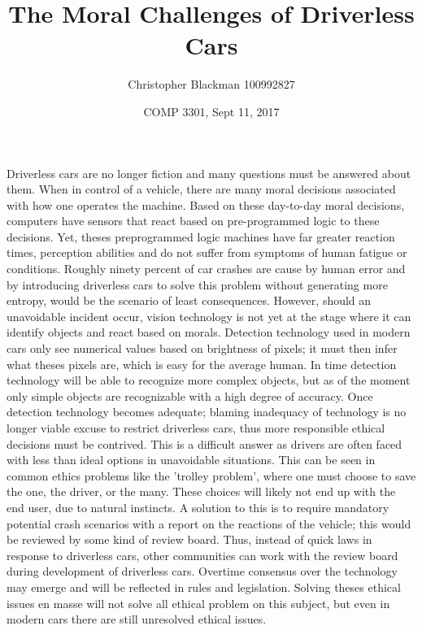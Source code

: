 \documentclass{article}[12pt]
\begin{document}
\title{\vspace{-4cm}
The Moral Challenges of Driverless Cars}
\author{Christopher Blackman 100992827}
\date{COMP 3301, Sept 11, 2017}

\maketitle



Driverless cars are no longer fiction and many questions must be answered about them.
When in control of a vehicle, there are many moral decisions associated with how one operates the machine.
Based on these day-to-day moral decisions, computers have sensors that react based on pre-programmed logic to these decisions.
Yet, theses preprogrammed logic machines have far greater reaction times, perception abilities and do not suffer from symptoms of human fatigue or conditions.
Roughly ninety percent of car crashes are cause by human error and by introducing driverless cars to solve this problem without generating more entropy, would be the scenario of least consequences.
However, should an unavoidable incident occur, vision technology is not yet at the stage where it can identify objects and react based on morals.
Detection technology used in modern cars only see numerical values based on brightness of pixels; it must then infer what theses pixels are, which is easy for the average human.
In time detection technology will be able to recognize more complex objects, but as of the moment only simple objects are recognizable with a high degree of accuracy.
Once detection technology becomes adequate; blaming inadequacy of technology is no longer viable excuse to restrict driverless cars, thus more responsible ethical decisions must be contrived.
This is a difficult answer as drivers are often faced with less than ideal options in unavoidable situations.
This can be seen in common ethics problems like the 'trolley problem', where one must choose to save the one, the driver, or the many.
These choices will likely not end up with the end user, due to natural instincts. 
A solution to this is to require mandatory potential crash scenarios with a report on the reactions of the vehicle; this would be reviewed by some kind of review board.
Thus, instead of quick laws in response to driverless cars, other communities can work with the review board during development of driverless cars.
Overtime consensus over the technology may emerge and will be reflected in rules and legislation.
Solving theses ethical issues en masse will not solve all ethical problem on this subject, but even in modern cars there are still unresolved ethical issues.
\end{document}
